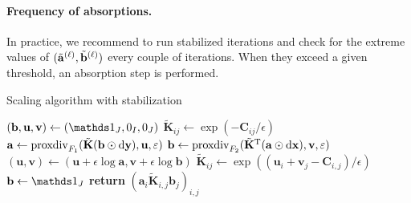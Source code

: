 \paragraph{Frequency of absorptions.}
In practice, we recommend to run stabilized iterations and check for the extreme values of $(\tilde{\mathbf{a}}^{(\ell)},\tilde{\mathbf{b}}^{(\ell)})$ every couple of iterations. When they exceed a given threshold, an absorption step is performed. 
%
\begin{algorithm}
\caption{Scaling algorithm with stabilization}\label{algo_scaling_stabilized}
\begin{algorithmic}[1]
   \State $(\mathbf{b},\mathbf{u},\mathbf{v}) \gets (\ones_J,0_I,0_J)$
   \State $\tilde{\mathbf{K}}_{ij} \gets \exp(-\mathbf{C}_{ij}/\epsilon)$  
   \Repeat
		\State $\mathbf{a} \gets \operatorname{proxdiv}_{F_1}(\tilde{\mathbf{K}}(\mathbf{b} \odot \mathbf{\mathrm{d} y}),\mathbf{u},\varepsilon)$
		\State  $\mathbf{b} \gets \operatorname{proxdiv}_{F_2}({\tilde{\mathbf{K}}}^{\mathrm{T}}(\mathbf{a} \odot \mathbf{\mathrm{d} x}),\mathbf{v},\varepsilon)$
	\State $(\mathbf{u},\mathbf{v}) \gets (\mathbf{u}+\epsilon \log \mathbf{a}, \mathbf{v} + \epsilon \log \mathbf{b})$\label{alg_line_uv}
	\State $\tilde{\mathbf{K}}_{ij} \gets \exp((\mathbf{u}_i + \mathbf{v}_j-\mathbf{C}_{i,j})/\epsilon)$ \label{alg_line_Kup}
	\State $\mathbf{b} \gets \ones_J$
	\EndIf
   \State \textbf{return} $(\mathbf{a}_i \tilde{\mathbf{K}}_{i,j} \mathbf{b}_j)_{i,j}$
\EndFunction
\end{algorithmic}
\end{algorithm}

